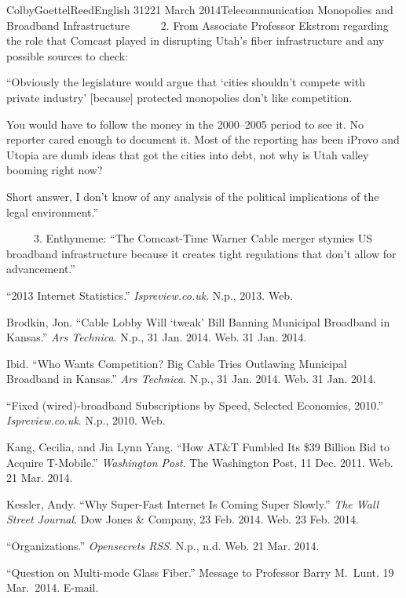 \documentclass[12pt]{article}
\begin{document}
\begin{mla}{Colby}{Goettel}{Reed}{English 312}{21 March 2014}{Telecommunication Monopolies and Broadband Infrastructure}
{\noindent\ \ \ \ \ 2. From Associate Professor Ekstrom regarding the role that Comcast played in disrupting Utah's fiber infrastructure and any possible sources to check:}
\begin{mlaquote}
    ``Obviously the legislature would argue that `cities shouldn't compete with private industry' [because] protected monopolies don't like competition.

    You would have to follow the money in the 2000--2005 period to see it. No reporter cared enough to document it. Most of the reporting has been iProvo and Utopia are dumb ideas that got the cities into debt, not why is Utah valley booming right now?

    Short answer, I don't know of any analysis of the political implications of the legal environment.''
\end{mlaquote}

{\noindent\ \ \ \ \ 3. Enthymeme: ``The Comcast-Time Warner Cable merger stymies US broadband infrastructure because it creates tight regulations that don't allow for advancement.''}

\begin{workscited}
    ``2013 Internet Statistics.'' \textit{Ispreview.co.uk}. N.p., 2013. Web.
    
    \bibent Brodkin, Jon. ``Cable Lobby Will `tweak' Bill Banning Municipal Broadband in Kansas.'' \textit{Ars Technica}. N.p., 31 Jan. 2014. Web. 31 Jan. 2014.
    
    \bibent Ibid. ``Who Wants Competition? Big Cable Tries Outlawing Municipal Broadband in Kansas.'' \textit{Ars Technica}. N.p., 31 Jan. 2014. Web. 31 Jan. 2014.
    
    \bibent ``Fixed (wired)-broadband Subscriptions by Speed, Selected Economies, 2010.'' \textit{Ispreview.co.uk}. N.p., 2010. Web.
    
    \bibent Kang, Cecilia, and Jia Lynn Yang. ``How AT\&T Fumbled Its \$39 Billion Bid to Acquire T-Mobile.'' \textit{Washington Post}. The Washington Post, 11 Dec. 2011. Web. 21 Mar. 2014.
    
    \bibent Kessler, Andy. ``Why Super-Fast Internet Is Coming Super Slowly.'' \textit{The Wall Street Journal}. Dow Jones \& Company, 23 Feb. 2014. Web. 23 Feb. 2014.
    
    \bibent ``Organizations.'' \textit{Opensecrets RSS}. N.p., n.d. Web. 21 Mar. 2014.
    
    \bibent ``Question on Multi-mode Glass Fiber.'' Message to Professor Barry M.\ Lunt. 19 Mar.\ 2014. E-mail.
    

\end{workscited}
\end{mla}
\end{document}
